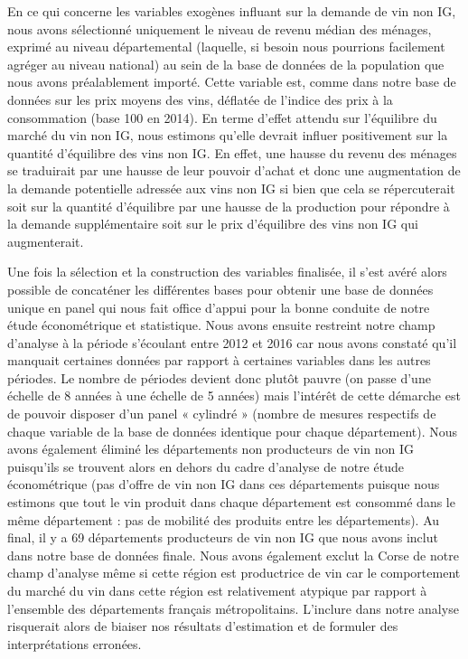 \documentclass[11pt,]{article}
\begin{document}
En ce qui concerne les variables exogènes influant sur la demande de vin
non IG, nous avons sélectionné uniquement le niveau de revenu médian des
ménages, exprimé au niveau départemental (laquelle, si besoin nous
pourrions facilement agréger au niveau national) au sein de la base de
données de la population que nous avons préalablement importé. Cette
variable est, comme dans notre base de données sur les prix moyens des
vins, déflatée de l'indice des prix à la consommation (base 100 en
2014). En terme d'effet attendu sur l'équilibre du marché du vin non IG,
nous estimons qu'elle devrait influer positivement sur la quantité
d'équilibre des vins non IG. En effet, une hausse du revenu des ménages
se traduirait par une hausse de leur pouvoir d'achat et donc une
augmentation de la demande potentielle adressée aux vins non IG si bien
que cela se répercuterait soit sur la quantité d'équilibre par une
hausse de la production pour répondre à la demande supplémentaire soit
sur le prix d'équilibre des vins non IG qui augmenterait.

Une fois la sélection et la construction des variables finalisée, il
s'est avéré alors possible de concaténer les différentes bases pour
obtenir une base de données unique en panel qui nous fait office d'appui
pour la bonne conduite de notre étude économétrique et statistique. Nous
avons ensuite restreint notre champ d'analyse à la période s'écoulant
entre 2012 et 2016 car nous avons constaté qu'il manquait certaines
données par rapport à certaines variables dans les autres périodes. Le
nombre de périodes devient donc plutôt pauvre (on passe d'une échelle de
8 années à une échelle de 5 années) mais l'intérêt de cette démarche est
de pouvoir disposer d'un panel « cylindré » (nombre de mesures
respectifs de chaque variable de la base de données identique pour
chaque département). Nous avons également éliminé les départements non
producteurs de vin non IG puisqu'ils se trouvent alors en dehors du
cadre d'analyse de notre étude économétrique (pas d'offre de vin non IG
dans ces départements puisque nous estimons que tout le vin produit dans
chaque département est consommé dans le même département : pas de
mobilité des produits entre les départements). Au final, il y a 69
départements producteurs de vin non IG que nous avons inclut dans notre
base de données finale. Nous avons également exclut la Corse de notre
champ d'analyse même si cette région est productrice de vin car le
comportement du marché du vin dans cette région est relativement
atypique par rapport à l'ensemble des départements français
métropolitains. L'inclure dans notre analyse risquerait alors de biaiser
nos résultats d'estimation et de formuler des interprétations erronées.
\end{document}
